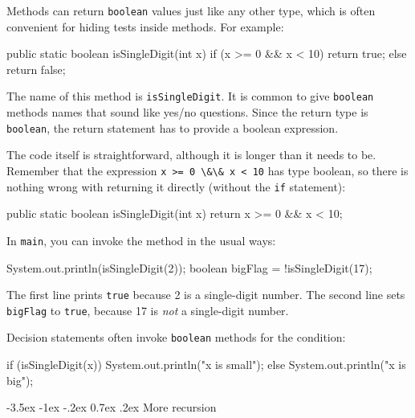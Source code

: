 \documentclass[12pt]{book}
\makeatletter
\theoremstyle{exercise}
\newcommand{\java}[1]{\verb"#1"}
\renewcommand{\section}{\@startsection {section}{1}{\z@}%
    {-3.5ex \@plus -1ex \@minus -.2ex}%
    {0.7ex \@plus.2ex}%
    {\normalfont\Large\bfseries}}
\newcommand{\java}[1]{\lstinline{#1}} %
\makeatother
\begin{document}
Methods can return \java{boolean} values just like any other type, which is often convenient for hiding tests inside methods.
For example:

\begin{code}
    public static boolean isSingleDigit(int x) {
        if (x >= 0 && x < 10) {
            return true;
        } else {
            return false;
        }
    }
\end{code}

The name of this method is \java{isSingleDigit}.
It is common to give \java{boolean} methods names that sound like yes/no questions.
Since the return type is \java{boolean}, the return statement has to provide a boolean expression.

The code itself is straightforward, although it is longer than it needs to be.
Remember that the expression \java{x >= 0 \&\& x < 10} has type boolean, so there is nothing wrong with returning it directly (without the \java{if} statement):

\begin{code}
    public static boolean isSingleDigit(int x) {
        return x >= 0 && x < 10;
    }
\end{code}

In \java{main}, you can invoke the method in the usual ways:

\begin{code}
    System.out.println(isSingleDigit(2));
    boolean bigFlag = !isSingleDigit(17);
\end{code}

The first line prints \java{true} because 2 is a single-digit number.
The second line sets \java{bigFlag} to \java{true}, because 17 is {\em not} a single-digit number.

Decision statements often invoke \java{boolean} methods for the condition:

\begin{code}
    if (isSingleDigit(x)) {
        System.out.println("x is small");
    } else {
        System.out.println("x is big");
    }
\end{code}


\section{More recursion}
\label{factorial}


\end{document}
